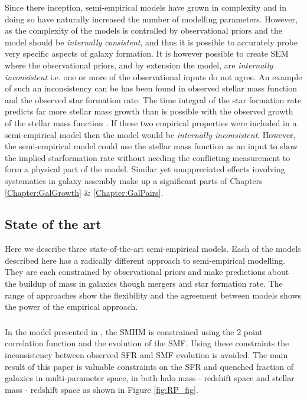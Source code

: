 Since there inception, semi-empirical models have grown in complexity and in doing so have naturally increased the number of modelling parameters. However, as the complexity of the models is controlled by observational priors and the model should be \textit{internally consistent}, and thus it is possible to accurately probe very specific aspects of galaxy formation. It is however possible to create SEM where the observational priors, and by extension the model, are \textit{internally inconsistent} i.e. one or more of the observational inputs do not agree. An example of such an inconsistency can be has been found in observed stellar mass function and the observed star formation rate. The time integral of the star formation rate predicts far more stellar mass growth than is possible with the observed growth of the stellar mass function \citep{Leja2015ReconcilingFunction,Lapi2017StellarEquation}. If these two empirical properties were included in a semi-empirical model then the model would be \textit{internally inconsistent}. However, the semi-empirical model could use the stellar mass function as an input to show the implied starformation rate without needing the conflicting measurement to form a physical part of the model. Similar yet unappreciated effects involving systematics in galaxy assembly make up a significant parts of Chapters \ref{Chapter:GalGrowth} \& \ref{Chapter:GalPairs}.

\subsection{State of the art}
Here we describe three state-of-the-art semi-empirical models. Each of the models described here has a radically different approach to semi-empirical modelling. They are each constrained by observational priors and make predictions about the buildup of mass in galaxies though mergers and star formation rate. The range of approaches show the flexibility and the agreement between models shows the power of the empirical approach. 


\subsubsection{\citet{Rodriguez-Puebla2017ConstrainingProperties}}
In the model presented in \citet{Rodriguez-Puebla2017ConstrainingProperties}, the SMHM is constrained using the 2 point correlation function and the evolution of the SMF. Using these constraints the inconsistency between observed SFR and SMF evolution is avoided. The main result of this paper is valuable constraints on the SFR and quenched fraction of galaxies in multi-parameter space, in both halo mass - redshift space and stellar mass - redshift space as shown in Figure \ref{fig:RP_fig}.

